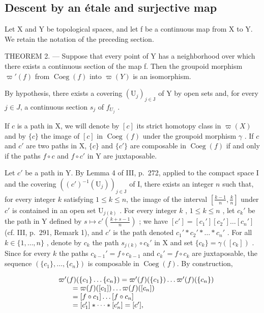 \subsection{Descent by an étale and surjective map}

Let X and Y be topological spaces, and let f be a continuous map from X to Y. We retain the notation of the preceding section.

THEOREM 2. --- Suppose that every point of Y has a neighborhood over which there exists a continuous section of the map f. Then the groupoid morphism \(\varpi'(f)\) from \(\operatorname{Coeg}(f)\) into \(\varpi(Y)\) is an isomorphism.

By hypothesis, there exists a covering \((\mathrm{U}_{j})_{j\in\mathrm{J}}\) of Y by open sets and, for every \(j\in J\), a continuous section \(s_{j}\) of \(f_{U_{j}}\) .

If \(c\) is a path in X, we will denote by \([c]\) its strict homotopy class in \(\varpi(X)\) and by \(\{c\}\) the image of \([c]\) in \(\operatorname{Coeg}(f)\) under the groupoid morphism \(\gamma\) . If \(c\) and \(c'\) are two paths in X, \(\{c\}\) and \(\{c'\}\) are composable in \(\operatorname{Coeg}(f)\) if and only if the paths \(f \circ c\) and \(f \circ c'\) in Y are juxtaposable.

Let \(c'\) be a path in Y. By Lemma 4 of III, p.~272, applied to the compact space I and the covering \(((c')^{-1}(\mathrm{U}_j))_{j\in \mathrm{J}}\) of I, there exists an integer \(n\) such that, for every integer \(k\) satisfying \(1\leqslant k\leqslant n\), the image of the interval \([\frac{k - 1}{n},\frac{k}{n}]\) under \(c'\) is contained in an open set \(\mathrm{U}_{j(k)}\) . For every integer \(k\) , \(1\leqslant k\leqslant n\) , let \(c_k'\) be the path in Y defined by \(s\mapsto c'(\frac{k + s - 1}{n})\) ; we have \([c'] = [c_1'][c_2']\ldots [c_n']\) (cf. III, p.~291, Remark 1), and \(c'\) is the path denoted \(c_1' * c_2' * \dots * c_n'\) . For all \(k\in \{1,\ldots ,n\}\) , denote by \(c_k\) the path \(s_{j(k)}\circ c_k'\) in X and set \(\{c_k\} = \gamma ([c_k])\) . Since for every \(k\) the paths \(c_{k - 1}' = f\circ c_{k - 1}\) and \(c_k' = f\circ c_k\) are juxtaposable, the sequence \((\{c_1\} ,\ldots ,\{c_n\})\) is composable in \(\operatorname{Coeg}(f)\). By construction,

\[
\begin{array}{r l} & {\varpi^ {\prime} (f) (\{c _ {1} \} \ldots \{c _ {n} \}) = \varpi^ {\prime} (f) (\{c _ {1} \}) \ldots \varpi^ {\prime} (f) (\{c _ {n} \})} \\ & {\qquad = \varpi (f) ([ c _ {1} ]) \ldots \varpi (f) ([ c _ {n} ])} \\ & {\qquad = [ f \circ c _ {1} ] \ldots [ f \circ c _ {n} ]} \\ & {\qquad = [ c _ {1} ^ {\prime} ] * \dots * [ c _ {n} ^ {\prime} ] = [ c ^ {\prime} ],} \end{array}
\]

